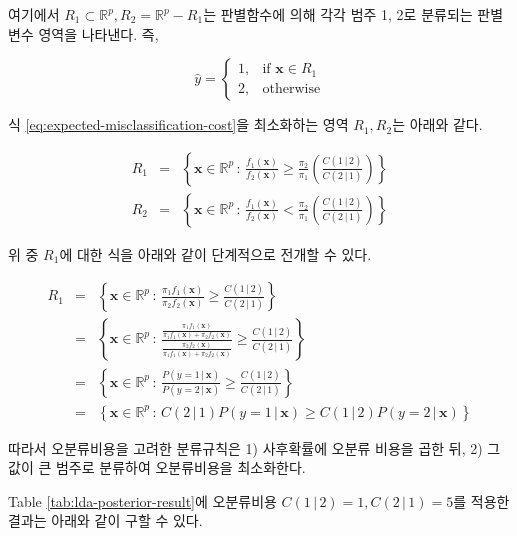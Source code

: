 \documentclass[]{book}
\begin{document}
여기에서 \(R_1 \subset \mathbb{R}^p, R_2 = \mathbb{R}^p - R_{1}\)는 판별함수에 의해 각각 범주 1, 2로 분류되는 판별변수 영역을 나타낸다. 즉,

\begin{equation*}
\hat{y} = \begin{cases}
    1, & \text{if } \mathbf{x} \in R_1  \\
    2, & \text{otherwise}
\end{cases}
\end{equation*}

식 \eqref{eq:expected-misclassification-cost}을 최소화하는 영역 \(R_1, R_2\)는 아래와 같다.

\begin{eqnarray*}
R_1 &=& \left\{\mathbf{x} \in \mathbb{R}^p \, :  \, \frac{f_1(\mathbf{x})}{f_2(\mathbf{x})} \ge \frac{\pi_2}{\pi_1} \left( \frac{C(1 \, | \, 2)}{C(2 \, | \, 1)} \right) \right\}\\
R_2 &=& \left\{\mathbf{x} \in \mathbb{R}^p \, :  \, \frac{f_1(\mathbf{x})}{f_2(\mathbf{x})} < \frac{\pi_2}{\pi_1} \left( \frac{C(1 \, | \, 2)}{C(2 \, | \, 1)} \right) \right\}
\end{eqnarray*}

위 중 \(R_1\)에 대한 식을 아래와 같이 단계적으로 전개할 수 있다.

\begin{eqnarray*}
R_1 &=& \left\{\mathbf{x} \in \mathbb{R}^p \, :  \, \frac{\pi_1 f_1(\mathbf{x})}{\pi_2 f_2(\mathbf{x})} \ge \frac{C(1 \, | \, 2)}{C(2 \, | \, 1)} \right\}\\
&=& \left\{\mathbf{x} \in \mathbb{R}^p \, :  \, \frac{\frac{\pi_1 f_1(\mathbf{x})}{\pi_1 f_1(\mathbf{x}) + \pi_2 f_2(\mathbf{x})}}{\frac{\pi_2 f_2(\mathbf{x})}{\pi_1 f_1(\mathbf{x}) + \pi_2 f_2(\mathbf{x})}} \ge \frac{C(1 \, | \, 2)}{C(2 \, | \, 1)} \right\}\\
&=& \left\{\mathbf{x} \in \mathbb{R}^p \, :  \, \frac{P(y = 1 \, | \, \mathbf{x})}{P(y = 2 \, | \, \mathbf{x})} \ge \frac{C(1 \, | \, 2)}{C(2 \, | \, 1)} \right\}\\
&=& \left\{\mathbf{x} \in \mathbb{R}^p \, :  \, C(2 \, | \, 1) P(y = 1 \, | \, \mathbf{x}) \ge C(1 \, | \, 2) P(y = 2 \, | \, \mathbf{x}) \right\}
\end{eqnarray*}

따라서 오분류비용을 고려한 분류규칙은 1) 사후확률에 오분류 비용을 곱한 뒤, 2) 그 값이 큰 범주로 분류하여 오분류비용을 최소화한다.

Table \ref{tab:lda-posterior-result}에 오분류비용 \(C(1 \, | \, 2) = 1, C(2 \, | \, 1) = 5\)를 적용한 결과는 아래와 같이 구할 수 있다.
\end{document}

